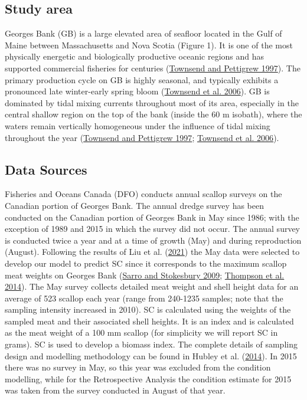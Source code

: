 \documentclass[
]{article}
\begin{document}
\hypertarget{study-area}{%
\subsection{Study area}\label{study-area}}

Georges Bank (GB) is a large elevated area of seafloor located in the Gulf of Maine between Massachusetts and Nova Scotia (Figure 1). It is one of the most physically energetic and biologically productive oceanic regions and has supported commercial fisheries for centuries (\protect\hyperlink{ref-townsendNitrogenLimitationSecondary1997}{Townsend and Pettigrew 1997}). The primary production cycle on GB is highly seasonal, and typically exhibits a pronounced late winter-early spring bloom (\protect\hyperlink{ref-townsendOceanographyNorthwestAtlantic2006}{Townsend et al. 2006}). GB is dominated by tidal mixing currents throughout most of its area, especially in the central shallow region on the top of the bank (inside the 60 m isobath), where the waters remain vertically homogeneous under the influence of tidal mixing throughout the year (\protect\hyperlink{ref-townsendNitrogenLimitationSecondary1997}{Townsend and Pettigrew 1997}; \protect\hyperlink{ref-townsendOceanographyNorthwestAtlantic2006}{Townsend et al. 2006}).

\hypertarget{data-sources}{%
\subsection{Data Sources}\label{data-sources}}

Fisheries and Oceans Canada (DFO) conducts annual scallop surveys on the Canadian portion of Georges Bank. The annual dredge survey has been conducted on the Canadian portion of Georges Bank in May since 1986; with the exception of 1989 and 2015 in which the survey did not occur. The annual survey is conducted twice a year and at a time of growth (May) and during reproduction (August). Following the results of Liu et al. (\protect\hyperlink{ref-liuUsingSatelliteRemote2021}{2021}) the May data were selected to develop our model to predict SC since it corresponds to the maximum scallop meat weights on Georges Bank (\protect\hyperlink{ref-sarroSpatialTemporalVariation2009}{Sarro and Stokesbury 2009}; \protect\hyperlink{ref-thompsonIdentifyingSpawningEvents2014}{Thompson et al. 2014}). The May survey collects detailed meat weight and shell height data for an average of 523 scallop each year (range from 240-1235 samples; note that the sampling intensity increased in 2010). SC is calculated using the weights of the sampled meat and their associated shell heights. It is an index and is calculated as the meat weight of a 100 mm scallop (for simplicity we will report SC in grams). SC is used to develop a biomass index. The complete details of sampling design and modelling methodology can be found in Hubley et al. (\protect\hyperlink{ref-hubleyGeorgesBankBrowns2014}{2014}). In 2015 there was no survey in May, so this year was excluded from the condition modelling, while for the Retrospective Analysis the condition estimate for 2015 was taken from the survey conducted in August of that year.
\end{document}
